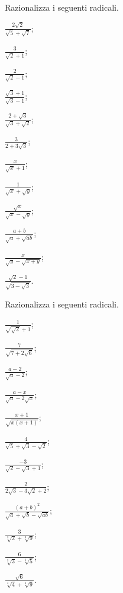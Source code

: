 \begin{esercizio}[\Ast]
 \label{ese:2.90}
Razionalizza i seguenti radicali.
 \begin{multicols}{4}
 \begin{enumeratea}
 \item $\frac{2\sqrt 2}{\sqrt 5+\sqrt 7}$;
 \item $\frac 3{\sqrt 2+1}$;
 \item $\frac 2{\sqrt 2-1}$;
 \item $\frac{\sqrt 3+1}{\sqrt 3-1}$;
 \item $\frac{2+\sqrt 3}{\sqrt 3+\sqrt 2}$;
 \item $\frac 3{2+3\sqrt 3}$;
 \item $\frac x{\sqrt x+1}$;
 \item $\frac 1{\sqrt x+\sqrt y}$;
 \item $\frac{\sqrt x}{\sqrt x-\sqrt y}$;
 \item $\frac{a+b}{\sqrt a+\sqrt{ab}}$;
 \item $\frac x{\sqrt y-\sqrt{x+y}}$;
 \item $\frac{\sqrt 2-1}{\sqrt{3-\sqrt 3}}$.
 \end{enumeratea}
 \end{multicols}
\end{esercizio}

\begin{esercizio}
 \label{ese:2.91}
Razionalizza i seguenti radicali.
 \begin{multicols}{4}
 \begin{enumeratea}
 \item $\frac 1{\sqrt{\sqrt 2}+1}$;
 \item $\frac 7{\sqrt{7+2\sqrt 6}}$;
 \item $\frac{a-2}{\sqrt a-2}$;
 \item $\frac{a-x}{\sqrt a-2\sqrt x}$;
 \item $\frac{x+1}{\sqrt{x(x+1)}}$;
 \item $\frac 4{\sqrt 5+\sqrt 3-\sqrt 2}$;
 \item $\frac{-3}{\sqrt 2-\sqrt 3+1}$;
 \item $\frac 2{2\sqrt 3-3\sqrt 2+2}$;
 \item $\frac{(a+b)^2}{\sqrt a+\sqrt b-\sqrt{ab}}$;
 \item $\frac 3{\sqrt[3]2+\sqrt[3]9}$;
 \item $\frac 6{\sqrt[3]3-\sqrt[3]5}$;
 \item $\frac{\sqrt 6}{\sqrt[3]4+\sqrt[3]9}$.
 \end{enumeratea}
 \end{multicols}
\end{esercizio}

